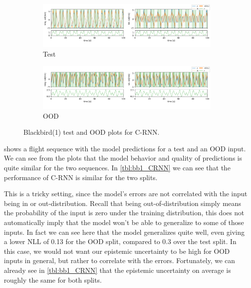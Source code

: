 \begin{figure}[h]
  \centering
  
  \begin{subfigure}[b]{\textwidth}
    \includegraphics[width=\textwidth]{Experiments/figs/bb1_test.png}
    \caption{Test}
  \end{subfigure}
  
  \begin{subfigure}[b]{\textwidth}
    \includegraphics[width=\textwidth]{Experiments/figs/bb1_ood.png}
    \caption{OOD}
  \end{subfigure}
  
  \caption{Blackbird(1) test and OOD plots for C-RNN.}
  \label{fig:bb1_run}
\end{figure}

 shows a flight sequence with the model predictions for a test and an OOD input. We can see from the plots that the model behavior and quality of predictions is quite similar for the two sequences. In \cref{tbl:bb1_CRNN} we can see that the performance of C-RNN is similar for the two splits.

This is a tricky setting, since the model's errors are not correlated with the input being in or out-distribution. Recall that being out-of-distribution simply means the probability of the input is zero under the training distribution, this does not automatically imply that the model won't be able to generalize to some of those inputs. In fact we can see here that the model generalizes quite well, even giving a lower NLL of 0.13 for the OOD split, compared to 0.3 over the test split. In this case, we would not want our epistemic uncertainty to be high for OOD inputs in general, but rather to correlate with the errors. 
Fortunately, we can already see in \cref{tbl:bb1_CRNN} that the epistemic uncertainty on average is roughly the same for both splits. 

